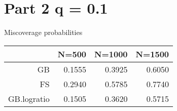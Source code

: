 \section*{Part 2 q = 0.1}


Miscoverage probabilities

\begin{tabular}{rrrr}
  \hline
 & N=500 & N=1000 & N=1500 \\ 
  \hline
GB & 0.1555 & 0.3925 & 0.6050 \\ 
  FS & 0.2940 & 0.5785 & 0.7740 \\ 
  GB.logratio & 0.1505 & 0.3620 & 0.5715 \\ 
   \hline
\end{tabular}
\vspace{0.2in}
